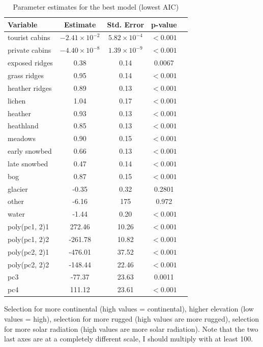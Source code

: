 \documentclass{article}
\begin{document}
\begin{table}[ht]
\caption{Parameter estimates for the best model (lowest AIC)}
\label{tab:model_results} %
\centering
\begin{tabular}{lcccc}
  \hline
 Variable & Estimate & Std. Error & p-value \\ 
  \hline
  tourist cabins & $-2.41 \times 10^{-2}$ & $5.82 \times 10^{-4}$ & $< 0.001$ \\ 
  private cabins & $-4.40 \times 10^{-8}$ & $1.39 \times 10^{-9}$ & $< 0.001$ \\ 
  exposed ridges & 0.38 & 0.14 & 0.0067 \\ 
  grass ridges & 0.95 & 0.14 & $< 0.001$ \\ 
  heather ridges & 0.89 & 0.13 & $< 0.001$ \\ 
  lichen & 1.04 & 0.17 & $< 0.001$ \\ 
  heather & 0.93 & 0.13 & $< 0.001$ \\ 
  heathland & 0.85 & 0.13 & $< 0.001$ \\ 
  meadows & 0.90 & 0.15 & $< 0.001$ \\ 
  early snowbed & 0.66 & 0.13 & $< 0.001$ \\ 
  late snowbed & 0.47 & 0.14 & $< 0.001$ \\ 
  bog & 0.87 & 0.15 & $< 0.001$ \\ 
  glacier & -0.35 & 0.32 & 0.2801 \\ 
  other & -6.16 & 175 & 0.972 \\ 
  water & -1.44 & 0.20 & $< 0.001$ \\ 
  poly(pc1, 2)1 & 272.46 & 10.26 & $< 0.001$ \\ 
  poly(pc1, 2)2 & -261.78 & 10.82 & $< 0.001$ \\ 
  poly(pc2, 2)1 & -476.01 & 37.52 & $< 0.001$ \\ 
  poly(pc2, 2)2 & -148.44 & 22.46 & $< 0.001$ \\ 
  pc3 & -77.37 & 23.63 & 0.0011 \\ 
  pc4 & 111.12 & 23.61 & $< 0.001$ \\ 
   \hline
\end{tabular}
\end{table}

Selection for more continental (high values = continental), higher elevation (low values = high), selection for more rugged (high values are more rugged), selection for more solar radiation (high values are more solar radiation). Note that the two last axes are at a completely different scale, I should multiply with at least 100.   
\end{document}
